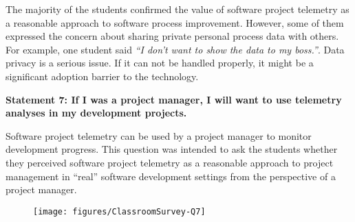 %

The majority of the students confirmed the value of software project telemetry as a reasonable approach to software process improvement. However, some of them expressed the concern about sharing private personal process data with others. For example, one student said \textit{``I don't want to show the data to my boss.''}. Data privacy is a serious issue. If it can not be handled properly, it might be a significant adoption barrier to the technology.




\newpage
\textbf{Statement 7: If I was a project manager, I will want to use telemetry analyses in my development projects.}

Software project telemetry can be used by a project manager to monitor development progress. This question was intended to ask the students whether they perceived software project telemetry as a reasonable approach to project management in ``real'' software development settings from the perspective of a project manager. 

\begin{quote}\end{quote} %

\begin{figure}[h]
  \center
  \texttt{[image: figures/ClassroomSurvey-Q7]}
  \label{fig:InClassSurvey-Q7}
\end{figure}

